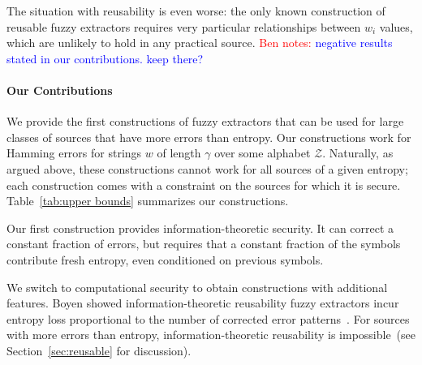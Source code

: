 \documentclass[11pt]{article}
\newcommand{\secref}[1]{\mbox{Section~\ref{#1}}}
\newcommand{\Huse}{\mathrm{H}_{\mathtt{usable}}}
\newcommand{\authnote}[2]{{\textcolor{red}{\textsf{#1 notes: }\textcolor{blue}{ #2}}\marginpar{\textcolor{red}{\textbf{!!!!!}}}}}
\newcommand{\authnote}[2]{}
\newcommand{\bnote}[1]{{\authnote{Ben}{#1}}}
\newcommand{\lnote}[1]{{\authnote{Leo}{#1}}}
\begin{document}


The situation with reusability is even worse: the only known construction of reusable fuzzy extractors \cite{Boyen2004} requires very particular relationships between $w_i$ values, which are unlikely to hold in any practical source. \bnote{negative results stated in our contributions. keep there?}


\paragraph{Our Contributions}
We provide the first constructions of fuzzy extractors that can be used for large classes of sources that have more errors than entropy.  Our constructions work for Hamming errors for strings $w$ of length $\gamma$ over some alphabet $\mathcal{Z}$. Naturally, as argued above, these constructions cannot work for all sources of a given entropy; each construction comes with a constraint on the sources for which it is secure.  Table~\ref{tab:upper bounds} summarizes our constructions.

Our first construction provides information-theoretic security.  It can correct a constant fraction of errors, but requires that a constant fraction of the symbols contribute fresh entropy, even conditioned on previous symbols. %

We switch to computational security to obtain constructions with additional features. Boyen showed information-theoretic reusability fuzzy extractors incur entropy loss proportional to the number of corrected error patterns~\cite[Theorem 11]{Boyen2004}.  For sources with more errors than entropy, information-theoretic reusability is impossible~(see \secref{sec:reusable} for discussion).  
\end{document}
